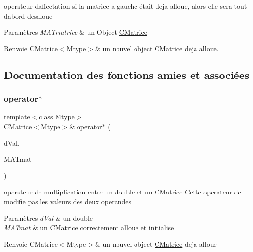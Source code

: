 operateur d\textquotesingle{}affectation si la matrice a gauche était deja alloue, alors elle sera tout d\textquotesingle{}abord desaloue 


\begin{DoxyParams}{Paramètres}
{\em M\+A\+Tmatrice} & un Object \hyperlink{classCMatrice}{C\+Matrice} \\
\hline
\end{DoxyParams}
\begin{DoxyReturn}{Renvoie}
C\+Matrice$<$\+Mtype$>$\& un nouvel object \hyperlink{classCMatrice}{C\+Matrice} deja alloue. 
\end{DoxyReturn}


\subsection{Documentation des fonctions amies et associées}
\mbox{\label{classCMatrice_a33685213ef22f3fd4cb0d783a2c555c3}} 
\subsubsection{\texorpdfstring{operator$\ast$}{operator*}}
{\footnotesize\ttfamily template$<$class Mtype$>$ \\
\hyperlink{classCMatrice}{C\+Matrice}$<$Mtype$>$\& operator$\ast$ (\begin{DoxyParamCaption}\item[{double}]{d\+Val,  }\item[{\hyperlink{classCMatrice}{C\+Matrice}$<$ Mtype $>$ \&}]{M\+A\+Tmat }\end{DoxyParamCaption})\hspace{0.3cm}{\ttfamily [friend]}}



operateur de multiplication entre un double et un \hyperlink{classCMatrice}{C\+Matrice} Cette operateur de modifie pas les valeurs des deux operandes 


\begin{DoxyParams}{Paramètres}
{\em d\+Val} & un double \\
\hline
{\em M\+A\+Tmat} & un \hyperlink{classCMatrice}{C\+Matrice} correctement alloue et initialise \\
\hline
\end{DoxyParams}
\begin{DoxyReturn}{Renvoie}
C\+Matrice$<$\+Mtype$>$\& un nouvel object \hyperlink{classCMatrice}{C\+Matrice} deja alloue 
\end{DoxyReturn}

